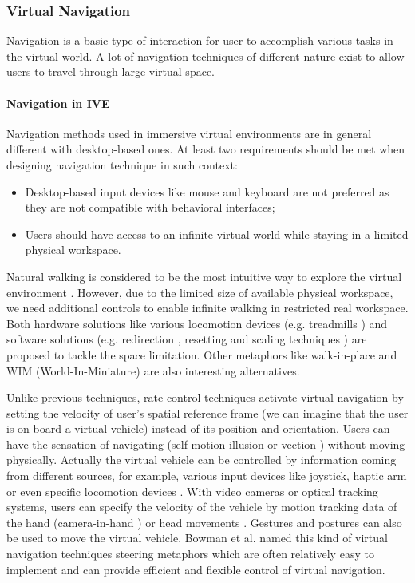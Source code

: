 \subsubsection{Virtual Navigation}
Navigation is a basic type of interaction for user to accomplish various tasks in the virtual world. A lot of navigation techniques of different nature exist to allow users to travel through large virtual space.


\paragraph{Navigation in IVE}
Navigation methods used in immersive virtual environments are in general different with desktop-based ones. At least two requirements should be met when designing navigation technique in such context:

\begin{itemize}
\item Desktop-based input devices like mouse and keyboard are not preferred as they are not compatible with behavioral interfaces;
\item Users should have access to an infinite virtual world while staying in a limited physical workspace.
\end{itemize}

Natural walking is considered to be the most intuitive way to explore the virtual environment \citep{Ruddle2009BW}. However, due to the limited size of available physical workspace, we need additional controls to enable infinite walking in restricted real workspace. Both hardware solutions like various locomotion devices (e.g. treadmills \citep{Iwata1999Treadmill}) and software solutions (e.g. redirection \citep{Peck2008RED}, resetting \citep{Williams2007ELV} and scaling techniques \citep{Interrante2007SLB}) are proposed to tackle the space limitation. Other metaphors like walk-in-place \citep{Razzaque2002RWP} and WIM (World-In-Miniature) \citep{Stoakley1995VRW} are also interesting alternatives.

Unlike previous techniques, rate control techniques activate virtual navigation by setting the velocity of user's spatial reference frame (we can imagine that the user is on board a virtual vehicle) instead of its position and orientation. Users can have the sensation of navigating (self-motion illusion or vection \citep{Riecke2012Vection}) without moving physically. Actually the virtual vehicle can be controlled by information coming from different sources, for example, various input devices like joystick, haptic arm \citep{Martin2012Forklift} or even specific locomotion devices \citep{Marchal2011JOYMAN}. With video cameras or optical tracking systems, users can specify the velocity of the vehicle by motion tracking data of the hand (camera-in-hand \citep{Ware1990EVC}) or head movements \citep{Bourdot2002HCNav}. Gestures \citep{Konrad2003Gesture} and postures \citep{Kapri2011Steering} can also be used to move the virtual vehicle. Bowman et al. named this kind of virtual navigation techniques steering metaphors \citep{Bowman2004UIT} which are often relatively easy to implement and can provide efficient and flexible control of virtual navigation.

